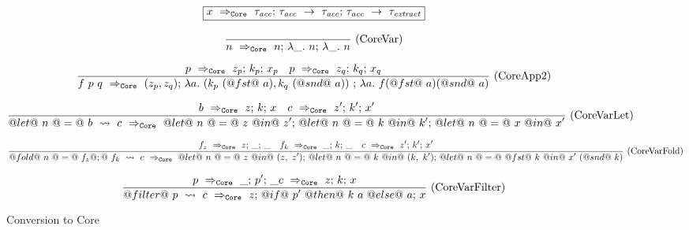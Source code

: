 
\begin{figure*}

\newcommand \acc {\tau_\mathit{acc}}
\newcommand \xtr {\tau_\mathit{extract}}
\newcommand \lam[1] {\lambda{} #1.~}

$$
\boxed{\ToCore{x}{\acc}{\acc~\to~\acc}{\acc~\to~\xtr}}
$$


$$
\ruleI
{
}
{ 
    \ToCore{n}{n}{\lam{\_} n}{\lam{\_} n}
}
\textrm{(CoreVar)}
$$

$$
\ruleI
{
    \ToCore{p}{z_p}{k_p}{x_p}
    \quad
    \ToCore{p}{z_q}{k_q}{x_q}
}
{ 
    \ToCore{f~p~q}{(z_p, z_q)}{\lam{a} (k_p~(@fst@~a), k_q~(@snd@~a))~}{\lam{a} f (@fst@~a) (@snd@~a)}
}
\textrm{(CoreApp2)}
$$

$$
\frac {\displaystyle 
    b ~\Rightarrow_{\mathtt{Core}}~ z\mathtt{;}~k\mathtt{;}~x
    \quad
    c ~\Rightarrow_{\mathtt{Core}}~ z'\mathtt{;}~k'\mathtt{;}~x'
} {\displaystyle  
    @let@~n~@=@~b~\leadsto~c ~\Rightarrow_{\mathtt{Core}}~ @let@~n~@=@~z~@in@~z'\mathtt{;}~@let@~n~@=@~k~@in@~k'\mathtt{;}~@let@~n~@=@~x~@in@~x'
} \ 
\textrm{(CoreVarLet)}
$$

$$
\frac {\displaystyle 
    f_z ~\Rightarrow_{\mathtt{Core}}~ z\mathtt{;}~\_\mathtt{;}~\_
    \quad
    f_k ~\Rightarrow_{\mathtt{Core}}~ \_\mathtt{;}~k\mathtt{;}~\_
    \quad
    c ~\Rightarrow_{\mathtt{Core}}~ z'\mathtt{;}~k'\mathtt{;}~x'
} {\displaystyle  
    @fold@~n~@=@~f_z@;@~f_k~\leadsto~c ~\Rightarrow_{\mathtt{Core}}~ @let@~n~@=@~z~@in@~(z,~z')\mathtt{;}~@let@~n~@=@~k~@in@~(k,~k')\mathtt{;}~@let@~n~@=@~@fst@~k~@in@~x'~(@snd@~k)
} \ 
\textrm{(CoreVarFold)}
$$

$$
\frac {\displaystyle 
    p ~\Rightarrow_{\mathtt{Core}}~ \_\mathtt{;}~p'\mathtt{;}~\_
    c ~\Rightarrow_{\mathtt{Core}}~ z\mathtt{;}~k\mathtt{;}~x
} {\displaystyle  
    @filter@~p~\leadsto~c ~\Rightarrow_{\mathtt{Core}}~ z\mathtt{;}~@if@~p'~@then@~k~a~@else@~a\mathtt{;}~x
} \ 
\textrm{(CoreVarFilter)}
$$



\caption{Conversion to Core}
\label{fig:source:core}
\end{figure*}


